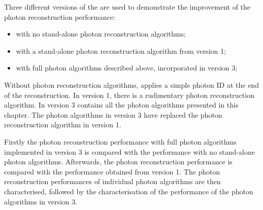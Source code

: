 

Three different versions of the \pandora are used to demonstrate the improvement of  the photon reconstruction performance:
\begin{itemize}
  \item with no stand-alone photon reconstruction algorithms;
  \item with a stand-alone photon reconstruction algorithm from \pandora version 1;
  \item with full photon algorithms described above, incorporated in \pandora version 3;
\end{itemize}

Without photon reconstruction algorithms, \pandora applies a simple photon ID at the end of the reconstruction. In \pandora version 1, there is a rudimentary photon reconstruction algorithm. In \pandora version 3 contains all the photon algorithms presented in this chapter. The photon algorithms in \pandora version 3 have replaced the   photon reconstruction algorithm in \pandora version 1.


Firstly the photon reconstruction performance with full photon algorithms implemented in \pandora version 3 is compared with the performance with no  stand-alone photon algorithms. Afterwards, the photon reconstruction performance  is compared with the performance obtained from  \pandora version 1. The photon reconstruction performances of individual photon algorithms are then characterised, followed by the characterisation of the performance of the photon algorithms in \pandora version 3.

